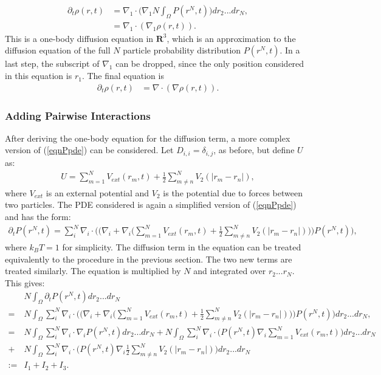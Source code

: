 \begin{align*} 
\partial_t \rho(r,t) &= \nabla_1 \cdot \bigg(\nabla_1 N \int_\Omega  P(r^N,t) \bigg)dr_2...dr_N,\\
&=  \nabla_1 \cdot(\nabla_1  \rho(r,t) ).
\end{align*}
This is a one-body diffusion equation in $\mathbf{R}^3$, which is an approximation to the diffusion equation of the full $N$ particle probability distribution $P(r^N,t)$. In a last step, the subscript of $\nabla_1$ can be dropped, since the only position considered in this equation is $r_1$. The final equation is
\begin{align} \label{eqnPMDiffTerm}
\partial_t \rho(r,t) &=  \nabla \cdot(\nabla \rho(r,t) ).
\end{align}


\subsubsection{Adding Pairwise Interactions}
After deriving the one-body equation for the diffusion term, a more complex version of (\ref{eqnPpde}) can be considered. Let $D_{i,i}= \delta_{i,j}$, as before, but define $U$ as: 
\begin{align*}
U= \sum_{m=1}^N V_{ext}(r_m,t) + \frac{1}{2} \sum_{m \neq n}^N V_2(|r_m - r_n|),
\end{align*}
where $V_{ext}$ is an external potential and $V_2$ is the potential due to forces between two particles.
The PDE considered is again a simplified version of (\ref{eqnPpde}) and has the form:
\begin{align} \label{eqnPpde2}
 \partial_t P(r^N,t)= \sum_{i}^N \nabla_i \cdot \bigg(\bigg( \nabla_i + \nabla_i \bigg( \sum_{m=1}^N V_{ext}(r_m,t) + \frac{1}{2} \sum_{m \neq n}^N V_2(|r_m - r_n|)\bigg)  \bigg) P(r^N,t) \bigg),
 \end{align}
where $k_B T=1$ for simplicity.
The diffusion term in the equation can be treated equivalently to the procedure in the previous section.
The two new terms are treated similarly. The equation is multiplied by $N$ and integrated over $r_2...r_N$.
This gives:
\begin{align*} 
&N\int_\Omega \partial_t P(r^N,t) dr_2...dr_N\\
=& N\int_\Omega \sum_{i}^N \nabla_i \cdot \bigg(\bigg( \nabla_i + \nabla_i \bigg( \sum_{m=1}^N V_{ext}(r_m,t) + \frac{1}{2} \sum_{m \neq n}^N V_2(|r_m - r_n|)\bigg)  \bigg) P(r^N,t) \bigg) dr_2...dr_N,\\
=& N\int_\Omega \sum_{i}^N \nabla_i \cdot \nabla_i P(r^N,t)dr_2...dr_N + N\int_\Omega \sum_{i}^N \nabla_i \cdot \bigg( P(r^N,t) \nabla_i \sum_{m=1}^N V_{ext}(r_m,t) \bigg) dr_2...dr_N\\ +& N\int_\Omega \sum_{i}^N \nabla_i \cdot \bigg( P(r^N,t)\nabla_i \frac{1}{2} \sum_{m \neq n}^N V_2(|r_m - r_n|) \bigg) dr_2...dr_N\\
:=& I_1 + I_2 +I_3.
\end{align*}
